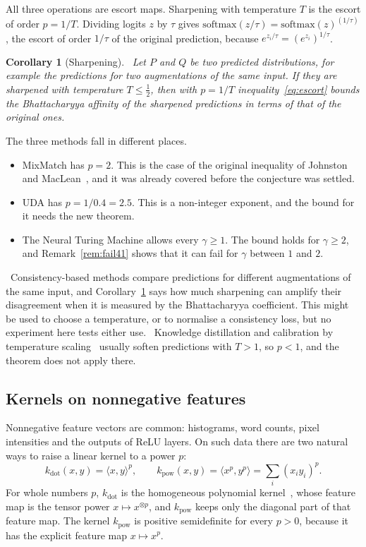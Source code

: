 \documentclass[11pt]{article}
\newtheorem{corollary}{Corollary}[section]
\theoremstyle{remark}
\newcommand{\ip}[2]{\langle #1,#2\rangle}
\newcommand{\claimtag}[2]{\tcbox[on line,boxsep=1pt,left=3pt,right=3pt,top=0pt,bottom=0pt,colback=#1!10,colframe=#1!70,boxrule=0.4pt,arc=1.5pt]{\sffamily\scriptsize\bfseries\color{#1}#2}}
\newcommand{\consequence}{\claimtag{ForestGreen}{PROVED HERE}}
\newcommand{\proposal}{\claimtag{accent}{PROPOSAL}}
\newcommand{\nofollow}{\claimtag{warn}{DOES NOT FOLLOW}}
\begin{document}
All three operations are escort maps. Sharpening with temperature $T$ is the escort of order $p=1/T$. Dividing logits $z$ by $\tau$ gives $\mathrm{softmax}(z/\tau)=\mathrm{softmax}(z)^{(1/\tau)}$, the escort of order $1/\tau$ of the original prediction, because $e^{z_i/\tau}=(e^{z_i})^{1/\tau}$.

\begin{corollary}[Sharpening]\label{cor:sharpen}
\consequence\ Let $P$ and $Q$ be two predicted distributions, for example the predictions for two augmentations of the same input. If they are sharpened with temperature $T\le\frac12$, then with $p=1/T$ inequality~\eqref{eq:escort} bounds the Bhattacharyya affinity of the sharpened predictions in terms of that of the original ones.
\end{corollary}

The three methods fall in different places.
\begin{itemize}
\item MixMatch has $p=2$. This is the case of the original inequality of Johnston and MacLean~\cite{JM19}, and it was already covered before the conjecture was settled.
\item UDA has $p=1/0.4=2.5$. This is a non-integer exponent, and the bound for it needs the new theorem.
\item The Neural Turing Machine allows every $\gamma\ge1$. The bound holds for $\gamma\ge2$, and Remark~\ref{rem:fail41} shows that it can fail for $\gamma$ between $1$ and $2$.
\end{itemize}

\proposal\ Consistency-based methods compare predictions for different augmentations of the same input, and Corollary~\ref{cor:sharpen} says how much sharpening can amplify their disagreement when it is measured by the Bhattacharyya coefficient. This might be used to choose a temperature, or to normalise a consistency loss, but no experiment here tests either use. \nofollow\ Knowledge distillation and calibration by temperature scaling~\cite{Hinton,Guo} usually soften predictions with $T>1$, so $p<1$, and the theorem does not apply there.

\subsection{Kernels on nonnegative features}

Nonnegative feature vectors are common: histograms, word counts, pixel intensities and the outputs of ReLU layers. On such data there are two natural ways to raise a linear kernel to a power $p$:
\[
k_{\mathrm{dot}}(x,y)=\ip xy^p,\qquad k_{\mathrm{pow}}(x,y)=\ip{x^p}{y^p}=\sum_i(x_iy_i)^p .
\]
For whole numbers $p$, $k_{\mathrm{dot}}$ is the homogeneous polynomial kernel~\cite{SchSm}, whose feature map is the tensor power $x\mapsto x^{\otimes p}$, and $k_{\mathrm{pow}}$ keeps only the diagonal part of that feature map. The kernel $k_{\mathrm{pow}}$ is positive semidefinite for every $p>0$, because it has the explicit feature map $x\mapsto x^p$.
\end{document}
